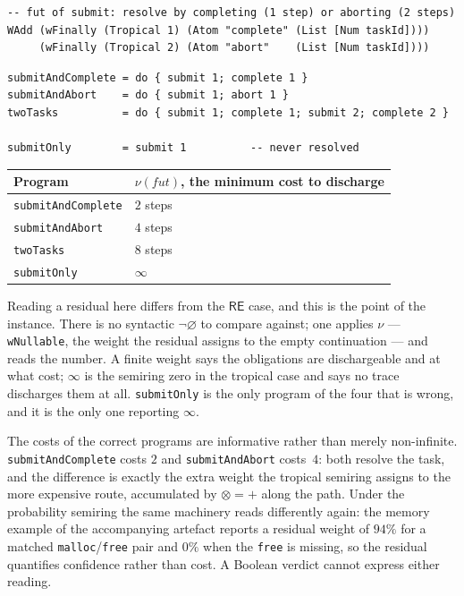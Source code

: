 \documentclass[acmsmall,screen]{acmart}
\newcommand{\RE}{\mathsf{RE}}
\newcommand{\fut}{\mathit{fut}}
\newcommand{\univ}{\neg\varnothing}
\begin{document}
\begin{lstlisting}
-- fut of submit: resolve by completing (1 step) or aborting (2 steps)
WAdd (wFinally (Tropical 1) (Atom "complete" (List [Num taskId])))
     (wFinally (Tropical 2) (Atom "abort"    (List [Num taskId])))
\end{lstlisting}

\begin{lstlisting}
submitAndComplete = do { submit 1; complete 1 }
submitAndAbort    = do { submit 1; abort 1 }
twoTasks          = do { submit 1; complete 1; submit 2; complete 2 }

submitOnly        = submit 1          -- never resolved
\end{lstlisting}

\begin{center}
\begin{tabular}{ll}
\toprule
Program & $\nu(\fut)$, the minimum cost to discharge \\
\midrule
\lstinline{submitAndComplete} & $2$ steps \\
\lstinline{submitAndAbort}    & $4$ steps \\
\lstinline{twoTasks}          & $8$ steps \\
\lstinline{submitOnly}        & $\infty$ \\
\bottomrule
\end{tabular}
\end{center}

\noindent
Reading a residual here differs from the $\RE$ case, and this is the point
of the instance.
There is no syntactic $\univ$ to compare against; one applies $\nu$ ---
\lstinline{wNullable}, the weight the residual assigns to the empty
continuation --- and reads the number.
A finite weight says the obligations are dischargeable and at what cost;
$\infty$ is the semiring zero in the tropical case and says no trace discharges
them at all.
\lstinline{submitOnly} is the only program of the four that is wrong, and it
is the only one reporting $\infty$.

The costs of the correct programs are informative rather than merely
non-infinite.
\lstinline{submitAndComplete} costs $2$ and \lstinline{submitAndAbort}
costs~$4$: both resolve the task, and the difference is exactly the extra
weight the tropical semiring assigns to the more expensive route, accumulated
by $\otimes = {+}$ along the path.
Under the probability semiring the same machinery reads differently again:
the memory example of the accompanying artefact reports a residual weight of
$94\%$ for a matched \lstinline{malloc}/\lstinline{free} pair and $0\%$ when
the \lstinline{free} is missing, so the residual quantifies confidence rather
than cost.
A Boolean verdict cannot express either reading.
\end{document}
